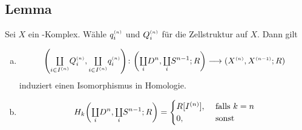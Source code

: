 \subsection[Lemma über $\enbrace{\coprod Q_i^\ssbrace{n}, \coprod q_i^\ssbrace{n}}_* $ und $H_k \enbrace{\coprod_i D^n, \coprod_i S^{n-1};R}$]{Lemma} %
\label{sub:125}
Sei $X$ ein \CW-Komplex. Wähle $q_i^{\scriptscriptstyle(n)}$ und $Q_i^{\scriptscriptstyle(n)}$ für die Zellstruktur auf $X$. Dann gilt
\begin{enumerate}[a)]
	\item 
	\[
		\enbrace*{{\textstyle\coprod\limits_{i \in I^{(n)}}} Q_i^\ssbrace{n}, {\textstyle\coprod\limits_{i \in I^{(n)}}} q_i^\ssbrace{n}} 
		\colon \enbrace*{{\textstyle\coprod\limits_i} D^n, {\textstyle\coprod\limits_i} S^{n-1};R}  \longrightarrow
		\enbrace*{X^\ssbrace{n}, X^\ssbrace{n-1};R} 
	\]
	induziert einen Isomorphismus in Homologie.
	\item \[
		H_k \enbrace*{{\textstyle\coprod\limits_i} D^n, {\textstyle\coprod\limits_i} S^{n-1};R} = \begin{cases}
			R[I^{(n)}], &\text{ falls }k=n\\
			0, & \text{ sonst}
		\end{cases}
	\] 
\end{enumerate}
